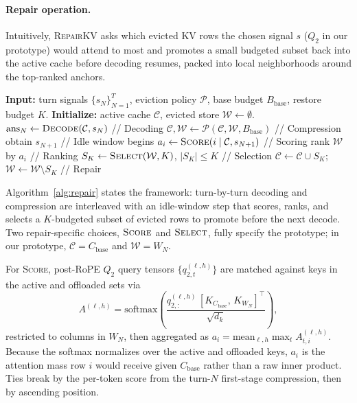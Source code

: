 \documentclass{article}
\newcommand{\repairkv}{\textsc{RepairKV}}
\newcommand{\bbase}{\ensuremath{B_{\mathrm{base}}}}
\begin{document}
\paragraph{Repair operation.}
Intuitively, \repairkv{} asks which evicted KV rows the
chosen signal $s$ ($Q_2$ in our prototype) would attend to most and
promotes a small
budgeted subset back into the active cache before decoding resumes,
packed into local neighborhoods around the top-ranked anchors.
\begin{algorithm}[t]
\caption{General \repairkv{} Execution Framework}
\label{alg:repair}
\begin{algorithmic}[1]
\STATE \textbf{Input:} turn signals $\{s_N\}_{N=1}^T$,
eviction policy $\mathcal{P}$, base budget $\bbase$, restore
budget $K$.
\STATE \textbf{Initialize:} active cache $\mathcal{C}$,
evicted store $\mathcal{W}\!\gets\!\emptyset$.
  \STATE $\mathrm{ans}_N \gets \textsc{Decode}(\mathcal{C}, s_N)$ \hfill // Decoding
  \STATE $\mathcal{C}, \mathcal{W} \gets \mathcal{P}(\mathcal{C}, \mathcal{W}, \bbase)$ \hfill // Compression
  \STATE obtain $s_{N+1}$ \hfill // Idle window begins
    \STATE $a_i \gets \textsc{Score}(i \mid \mathcal{C}, s_{N+1})$ \hfill // Scoring
  \ENDFOR
  \STATE rank $\mathcal{W}$ by $a_i$ \hfill // Ranking
  \STATE $S_K \gets \textsc{Select}(\mathcal{W}, K)$, $|S_K|\!\le\!K$ \hfill // Selection
  \STATE $\mathcal{C} \gets \mathcal{C}\!\cup\!S_K$;\, $\mathcal{W} \gets \mathcal{W}\!\setminus\!S_K$ \hfill // Repair
\ENDFOR
\end{algorithmic}
\end{algorithm}
Algorithm~\ref{alg:repair} states the framework:
turn-by-turn decoding and compression are interleaved with an
idle-window step that scores, ranks, and selects a $K$-budgeted subset
of evicted rows to promote before the next decode. Two
repair-specific choices, $\textsc{Score}$ and $\textsc{Select}$, fully
specify the prototype; in our prototype, $\mathcal{C} = C_{\mathrm{base}}$
and $\mathcal{W} = W_N$.

For \textsc{Score}, post-RoPE $Q_2$ query tensors
$\{q^{(\ell,h)}_{2,t}\}$ are matched against keys in the active and
offloaded sets via
\begin{equation}
  A^{(\ell,h)} = \mathrm{softmax}\!\left(
    \frac{q^{(\ell,h)}_{2,:}\, [K_{C_{\mathrm{base}}},\, K_{W_N}]^{\top}}
         {\sqrt{d_k}}
  \right),
  \label{eq:score-attn}
\end{equation}
restricted to columns in $W_N$, then aggregated as
$a_i = \mathrm{mean}_{\ell, h} \max_t A^{(\ell,h)}_{t,i}$.
Because the softmax normalizes over the active and offloaded keys,
$a_i$ is the attention mass row $i$ would receive given
$C_{\mathrm{base}}$ rather than a raw inner product. Ties break
by the per-token score from the turn-$N$ first-stage compression, then
by ascending position.
\end{document}
